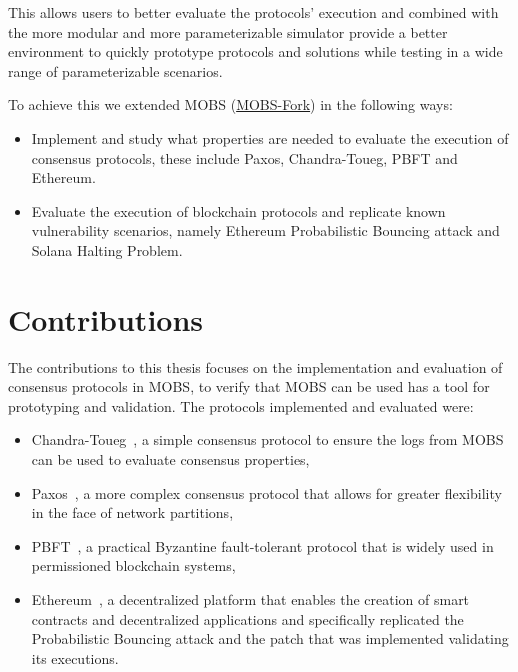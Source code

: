 This allows users to better evaluate the protocols' execution and combined with the more modular and more
parameterizable simulator provide a better environment to quickly prototype protocols and solutions while testing in
a wide range of parameterizable scenarios.

To achieve this we extended MOBS (\href{https://github.com/RMLoureiro/MOBS}{MOBS-Fork}) in the following ways:
\begin{itemize}
  \item Implement and study what properties are needed to evaluate the execution of consensus protocols, these include Paxos, Chandra-Toueg, PBFT and Ethereum.
  \item Evaluate the execution of blockchain protocols and replicate known
    vulnerability scenarios, namely Ethereum Probabilistic Bouncing attack\cite{ethereum_analysis} and 
    Solana Halting Problem\cite{solana_halting_problem}.
\end{itemize}



\section{Contributions}\label{sub:contributions}
The contributions to this thesis focuses on the implementation and evaluation of consensus protocols in MOBS, to verify that MOBS can be used
has a tool for prototyping and validation. The protocols implemented and evaluated were:
\begin{itemize}
  \item Chandra-Toueg~\cite{chandra}, a simple consensus protocol to ensure the logs from MOBS can be used to evaluate consensus properties,
  \item Paxos~\cite{paxos}, a more complex consensus protocol that allows for greater flexibility in the face of network partitions,
  \item PBFT~\cite{pbft}, a practical Byzantine fault-tolerant protocol that is widely used in permissioned blockchain systems,
  \item Ethereum~\cite{ethereum}, a decentralized platform that enables the creation of smart contracts and decentralized applications and specifically
replicated the Probabilistic Bouncing attack and the patch that was implemented validating its executions.
\end{itemize}